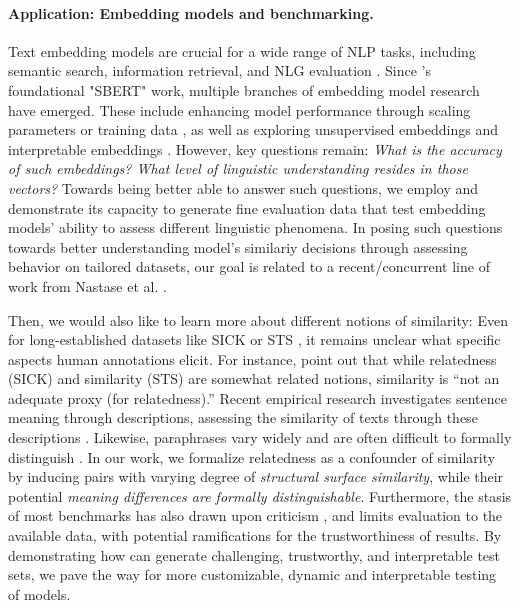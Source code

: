 \paragraph{Application: Embedding models and benchmarking.} Text embedding models are crucial for a wide range of NLP tasks, including semantic search, information retrieval, and NLG evaluation \citep{clark2019sentence, muennighoff2022sgpt, gao2023retrieval}. Since \citet{reimers-gurevych-2019-sentence}'s foundational "SBERT" work, multiple branches of embedding model research have emerged. These include enhancing model performance through scaling parameters \citep{wang2023improving} or training data \citep{wang2022text}, as well as exploring unsupervised embeddings \citep{gao-etal-2021-simcse} and interpretable embeddings \citep{opitz-frank-2022-sbert}. However, key questions remain: \textit{What is the accuracy of such embeddings? What level of linguistic understanding resides in those vectors?} Towards being better able to answer such questions, we employ \model and demonstrate its capacity to generate fine evaluation data that test embedding models' ability to assess different linguistic phenomena. In posing such questions towards better understanding model's similariy decisions through assessing behavior on tailored datasets, our goal is related to a recent/concurrent line of work from Nastase et al. \citep{nastase-merlo-2024-tracking, nastase2024exploring, nastase2024exploringsy}.

Then, we would also like to learn more about different notions of similarity: Even for long-established datasets like SICK \citep{marelli-etal-2014-sick} or STS \citep{agirre-etal-2016-semeval}, it remains unclear what specific aspects human annotations elicit. For instance, \citet{budanitsky-hirst-2006-evaluating} point out that while relatedness (SICK) and similarity (STS) are somewhat related notions, similarity is ``not an adequate proxy (for relatedness).'' Recent empirical research investigates sentence meaning through descriptions, assessing the similarity of texts through these descriptions \citep{hoyle-etal-2023-natural, ravfogel2024descriptionbased}. Likewise, paraphrases vary widely and are often difficult to formally distinguish \citep{michail-etal-2025-paraphrasus}. In our work, we formalize relatedness as a confounder of similarity by inducing pairs with varying degree of \textit{structural surface similarity}, while their potential \textit{meaning differences are formally distinguishable}. Furthermore, the stasis of most benchmarks has also drawn upon criticism \citep{fan-etal-2024-nphardeval}, and limits evaluation to the available data, with potential ramifications for the trustworthiness of results. By demonstrating how \model can generate challenging, trustworthy, and interpretable test sets, we pave the way for more customizable, dynamic and interpretable testing of models.